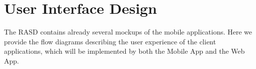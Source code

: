 
\section{User Interface Design}

The RASD contains already several mockups of the mobile applications. Here we provide the flow diagrams describing the user experience of the client applications, which will be implemented by both the Mobile App and the Web App.

